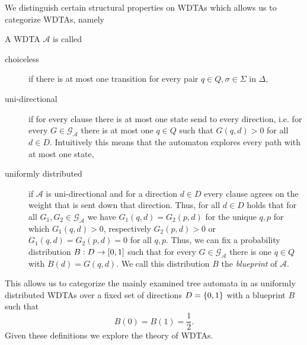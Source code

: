 We distinguish certain structural properties on \acp{WDTA} which allows us to
categorize \acp{WDTA}, namely
\begin{definition}
  A \ac{WDTA} $\mathcal{A}$ is called
  \begin{description}
    \item [choiceless] if there is at most one transition for every pair 
      $q\in Q, \sigma\in\Sigma$ in $\Delta$,
    \item [uni-directional] if for every clause there is at most one state send
      to every direction, i.e. for every $G\in\mathcal{G}_{\mathcal{A}}$
      there is at most one $q\in Q$ such that $G(q, d) > 0$ for all
      $d\in D$. Intuitively this means that the automaton explores every path
      with at most one state,
    \item [uniformly distributed] if $\mathcal{A}$ is uni-directional
      and for a direction $d\in D$ every clause agrees on the weight that is
      sent down that direction. Thus, for all $d\in D$ holds that for all
      $G_{1}, G_{2}\in\mathcal{G}_{\mathcal{A}}$ we have
      $G_{1}(q, d) = G_{2}(p, d)$ for the unique $q, p$ for which
      $G_{1}(q, d) > 0$, respectively $G_{2}(p, d) > 0$ or
      $G_{1}(q, d) = G_{2}(p, d) = 0$ for all $q, p$. Thus, we can fix a
      probability distribution $B:D\rightarrow \left[0,1\right]$ such that for
      every $G\in\mathcal{G}_{\mathcal{A}}$ there is one $q\in Q$ with
      $B(d) = G(q, d)$. We call this distribution $B$ the \emph{blueprint} of
      $\mathcal{A}$. 
  \end{description}
\end{definition}
This allows us to categorize the mainly examined tree automata in 
\cite{RandAutoInfTrees} as uniformly distributed \acp{WDTA} over a fixed set of
directions $D = \left\{0,1\right\}$ with a blueprint $B$ such that
\begin{equation*}
  B(0) = B(1) = \frac{1}{2}.
\end{equation*}
Given these definitions we explore the theory of \acp{WDTA}.

